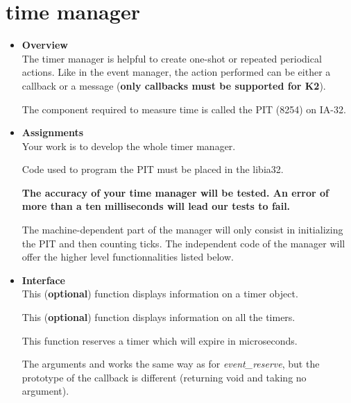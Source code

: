 \section{\textbf{time} manager}
\begin{itemize}
  \item {\bf Overview}\\

    The timer manager is helpful to create one-shot or repeated
    periodical actions. Like in the event manager, the action
    performed can be either a callback or a message (\textbf{only
    callbacks must be supported for K2}).

    The component required to measure time is called the PIT (8254) on
    IA-32.\\

  \item {\bf Assignments}\\

    Your work is to develop the whole timer manager.

    Code used to program the PIT must be placed in the libia32.

    \textbf{The accuracy of your time manager will be tested. An error
    of more than a ten milliseconds will lead our tests to fail.}

    The machine-dependent part of the manager will only consist in
    initializing the PIT and then counting ticks. The independent code
    of the manager will offer the higher level functionnalities listed
    below.\\

  \item {\bf Interface}\\

	 {
	   This (\textbf{optional}) function displays information on a
	   timer object.
	 }

	 {
	   This (\textbf{optional}) function displays information on
	   all the timers.
	 }

	 {
	   This function reserves a timer which will expire in
	    microseconds.

	   The arguments  and  works
	   the same way as for \emph{event\_reserve}, but the
	   prototype of the callback is different (returning void and
	   taking no argument).

}
\end{itemize}

